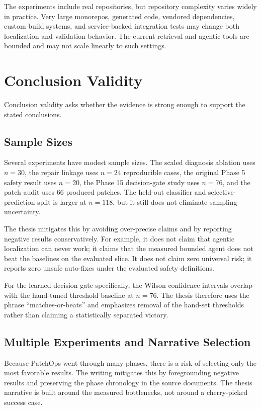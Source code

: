 The experiments include real repositories, but repository complexity varies widely in practice. Very large
monorepos, generated code, vendored dependencies, custom build systems, and service-backed integration tests may
change both localization and validation behavior. The current retrieval and agentic tools are bounded and may
not scale linearly to such settings.

\section{Conclusion Validity}

Conclusion validity asks whether the evidence is strong enough to support the stated conclusions.

\subsection{Sample Sizes}

Several experiments have modest sample sizes. The scaled diagnosis ablation uses \(n=30\), the repair linkage
uses \(n=24\) reproducible cases, the original Phase 5 safety result uses \(n=20\), the Phase 15 decision-gate
study uses \(n=76\), and the patch audit uses 66 produced patches. The held-out classifier and
selective-prediction split is larger at \(n=118\), but it still does not eliminate sampling uncertainty.

The thesis mitigates this by avoiding over-precise claims and by reporting negative results conservatively. For
example, it does not claim that agentic localization can never work; it claims that the measured bounded agent
does not beat the baselines on the evaluated slice. It does not claim zero universal risk; it reports zero
unsafe auto-fixes under the evaluated safety definitions.

For the learned decision gate specifically, the Wilson confidence intervals overlap with the hand-tuned
threshold baseline at \(n=76\). The thesis therefore uses the phrase ``matches-or-beats'' and emphasizes removal
of the hand-set thresholds rather than claiming a statistically separated victory.

\subsection{Multiple Experiments and Narrative Selection}

Because PatchOps went through many phases, there is a risk of selecting only the most favorable results. The
writing mitigates this by foregrounding negative results and preserving the phase chronology in the source
documents. The thesis narrative is built around the measured bottlenecks, not around a cherry-picked success
case.

